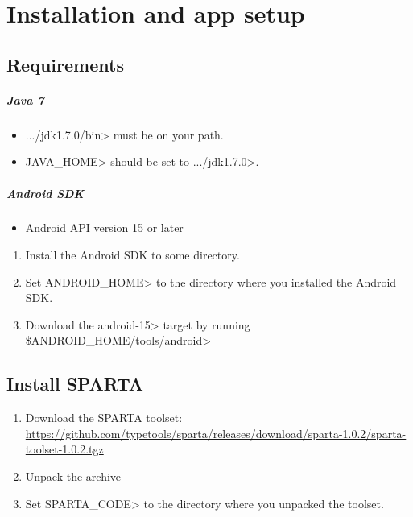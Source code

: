 \htmlhr
\chapter{Installation and app setup\label{installation}}

\section {Requirements\label{sec:requirements}}
\paragraph{Java 7}
\begin{itemize}
 \item  \<.../jdk1.7.0/bin> must be on your path.
 \item \<JAVA\_HOME> should be set to \<.../jdk1.7.0>.
\end{itemize}

\paragraph{Android SDK}
\begin{itemize}
 \item Android API version 15 or later
\end{itemize}
\begin{enumerate}
 \item Install the Android SDK to some directory.
 \item Set \<ANDROID\_HOME> to the directory where you installed the
   Android SDK.
 \item Download the \<android-15> target by running \<\$ANDROID\_HOME/tools/android>
\end{enumerate}


\section{Install SPARTA}

\begin{enumerate}
\item Download the SPARTA toolset: \url{https://github.com/typetools/sparta/releases/download/sparta-1.0.2/sparta-toolset-1.0.2.tgz}

\item Unpack the archive

\item Set \<SPARTA\_CODE> to the directory where you unpacked the toolset.
\end{enumerate}

